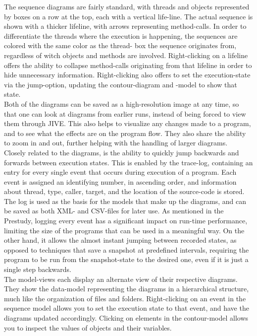 The sequence diagrams are fairly standard, with threads and objects represented by boxes on a row at the top, each with a vertical life-line.%
The actual sequence is shown with a thicker lifeline, with arrows representing method-calls.
In order to differentiate the threads where the execution is happening, the sequences are colored with the same color as the thread- box the sequence originates from, regardless of witch objects and methods are involved.
Right-clicking on a lifeline offers the ability to collapse method-calls originating from that lifeline in order to hide unnecessary information.
Right-clicking also offers to set the execution-state via the jump-option, updating the contour-diagram and -model to show that state.
~\\

Both of the diagrams can be saved as a high-resolution image at any time, so that one can look at diagrams from earlier runs, instead of being forced to view them through JIVE.
This also helps to visualize any changes made to a program, and to see what the effects are on the program flow.
They also share the ability to zoom in and out, further helping with the handling of larger diagrams.
~\\

Closely related to the diagrams, is the ability to quickly jump backwards and forwards between execution states.
This is enabled by the trace-log, containing an entry for every single event that occurs during execution of a program.
Each event is assigned an identifying number, in ascending order, and information about thread, type, caller, target, and the location of the source-code is stored.
The log is used as the basis for the models that make up the diagrams, and can be saved as both XML- and CSV-files for later use.
As mentioned in the Prestudy, logging every event has a significant impact on run-time performance, limiting the size of the programs that can be used in a meaningful way.
On the other hand, it allows the almost instant jumping between recorded states, as opposed to techniques that save a snapshot at predefined intervals, requiring the program to be run from the snapshot-state to the desired one, even if it is just a single step backwards.
~\\

The model-views each display an alternate view of their respective diagrams.%
They show the data-model representing the diagrams in a hierarchical structure, much like the organization of files and folders.
Right-clicking on an event in the sequence model allows you to set the execution state to that event, and have the diagrams updated accordingly.
Clicking on elements in the contour-model allows you to inspect the values of objects and their variables.
~\\

